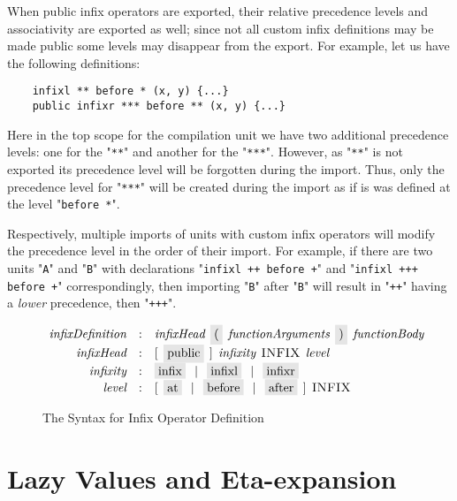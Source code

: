 When public infix operators are exported, their relative precedence levels and associativity are exported as well; since not all 
custom infix definitions may be made public some levels may disappear from the export. For example, let us have the following definitions:

\begin{lstlisting}
    infixl ** before * (x, y) {...}
    public infixr *** before ** (x, y) {...}
\end{lstlisting}

Here in the top scope for the compilation unit we have two additional precedence levels: one for the "\lstinline|**|" and another for the "\lstinline|***|".
However, as  "\lstinline|**|" is not exported its precedence level will be forgotten during the import. Thus, only the precedence level for
"\lstinline|***|" will be created during the import as if is was defined at the level  "\lstinline|before *|".

Respectively, multiple imports of units with custom infix operators will modify the precedence level in the order of their import. For example,
if there are two units  "\lstinline|A|" and  "\lstinline|B|" with declarations "\lstinline|infixl ++ before +|" and "\lstinline|infixl +++ before +|"
correspondingly, then importing  "\lstinline|B|" after  "\lstinline|B|" will result in "\lstinline|++|" having a \emph{lower} precedence, then
"\lstinline|+++|".

\begin{figure}[t]
  \[
    \begin{array}{rcl}
      \defterm{infixDefinition} & : & \nonterm{infixHead}\s\term{(}\s\nonterm{functionArguments}\s\term{)}\s\nonterm{functionBody}\\
      \defterm{infixHead}       & : & [\s\term{public}\s]\s\nonterm{infixity}\s\token{INFIX}\s\nonterm{level}\\
      \defterm{infixity}        & : & \term{infix}\alt\term{infixl}\alt\term{infixr}\\
      \defterm{level}           & : & [\s\term{at}\alt\term{before}\alt\term{after}\s]\s\token{INFIX}
    \end{array}
  \]
  \caption{The Syntax for Infix Operator Definition}
  \label{custom_infix_construct}
\end{figure}

\section{Lazy Values and Eta-expansion}

